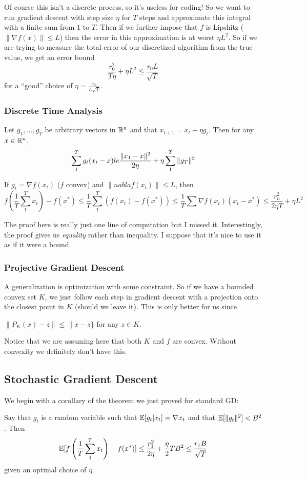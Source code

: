 \documentclass[12pt]{article}
\begin{document}
Of course this isn't a discrete process, so it's useless for coding! So we want to run gradient descent with step size $\eta$ for $T$ steps and approximate this integral with a finite sum from $1$ to $T$.
Then if we further impose that $f$ is Lipshitz ($\|\nabla f(x)\|\le L$) then the error in this approximation is at worst $\eta L^2$.
So if we are trying to measure the total error of our discretized algorithm from the true value, we get an error bound 
\[\frac{r_0^2}{T\eta}+\eta L^2\le \frac{r_0L}{\sqrt{T}}\]
for a ``good'' choice of $\eta=\frac{r_0}{L\sqrt{T}}$.
\subsubsection{Discrete Time Analysis}
\begin{thm}
	Let $g_1,\dots,g_T$ be arbitrary vectors in $\mathbb{R}^n$ and that $x_{t+1}=x_t-\eta g_t$. Then for any $x\in\mathbb{R}^n$,
	\[\sum_1^Tg_t(x_t-x)\\le \frac{\|x_1-x\|^2}{2\eta}+\eta\sum_1^T\|g_T\|^2\]
\end{thm}
\begin{cor}
	If $g_t=\nabla f(x_t)$ ($f$ convex) and $\|nabla f(x_t)\|\le L$, then
	\[f\left(\frac{1}{T}\sum_1^Tx_t\right)-f(x^\ast)\le\frac{1}{T}\sum_1^T(f(x_t)-f(x^\ast))\le\frac{1}{T}\sum \nabla f(x_t)(x_t-x^\ast)\le\frac{r_n^2}{2\eta T}+\eta L^2\] 
\end{cor}
The proof here is really just one line of computation but I missed it. Interestingly, the proof gives us \textit{equality} rather than inequality. I suppose that it's nice to use it as if it were a bound.

\subsubsection{Projective Gradient Descent}
A generalization is optimization with some constraint. So if we have a bounded convex set $K$, we just follow each step in gradient descent with a projection onto the closest point in $K$ (should we leave it).
This is only better for us since 
\begin{lem}
	$\|P_K(x)-z\|\le\| x-z\}$ for any $z\in K$.
\end{lem}
\begin{rmk}
	Notice that we are assuming here that both $K$ and $f$ are convex. Without convexity we definitely don't have this.
\end{rmk}

\subsection{Stochastic Gradient Descent}
We begin with a corollary of the theorem we just proved for standard GD:
\begin{cor}
	Say that $g_t$ is a random variable such that $\mathbb{E}[g_t|x_t]=\nabla x_t$ and that $\mathbb{E}[\|g_t\|^2]<B^2$.
	Then 
	\[\mathbb{E}[f\left(\frac{1}{T}\sum_1^T x_t\right)-f(x^\ast)]\le\frac{r_1^2}{2\eta}+\frac{\eta}{2}TB^2\le\frac{r_1B}{\sqrt{T}}\]
	given an optimal choice of $\eta$.
\end{cor}
\end{document}
